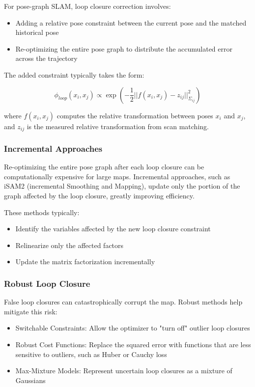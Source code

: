 \documentclass[journal]{IEEEtran}
\begin{document}
For pose-graph SLAM, loop closure correction involves:

\begin{itemize}
    \item Adding a relative pose constraint between the current pose and the matched historical pose
    \item Re-optimizing the entire pose graph to distribute the accumulated error across the trajectory
\end{itemize}

The added constraint typically takes the form:

\begin{equation}
    \phi_{loop}(x_i, x_j) \propto \exp\left(-\frac{1}{2}||f(x_i, x_j) - z_{ij}||^2_{\Sigma_{ij}}\right)
\end{equation}

where $f(x_i, x_j)$ computes the relative transformation between poses $x_i$ and $x_j$, and $z_{ij}$ is the measured relative transformation from scan matching.

\subsubsection{Incremental Approaches}

Re-optimizing the entire pose graph after each loop closure can be computationally expensive for large maps. Incremental approaches, such as iSAM2 (incremental Smoothing and Mapping), update only the portion of the graph affected by the loop closure, greatly improving efficiency.

These methods typically:
\begin{itemize}
    \item Identify the variables affected by the new loop closure constraint
    \item Relinearize only the affected factors
    \item Update the matrix factorization incrementally
\end{itemize}

\subsubsection{Robust Loop Closure}

False loop closures can catastrophically corrupt the map. Robust methods help mitigate this risk:

\begin{itemize}
    \item Switchable Constraints: Allow the optimizer to "turn off" outlier loop closures
    \item Robust Cost Functions: Replace the squared error with functions that are less sensitive to outliers, such as Huber or Cauchy loss
    \item Max-Mixture Models: Represent uncertain loop closures as a mixture of Gaussians
\end{itemize}
\end{document}
